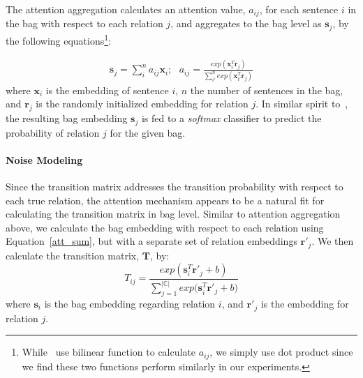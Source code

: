 The attention aggregation calculates an attention value, $a_{ij}$, for each sentence $i$ in the bag with respect to each relation $j$, and aggregates to  the bag level as  $\mathbf{s}_j$, by the following equations\footnote{While~\cite{lin2016neural} use bilinear function to calculate $a_{ij}$, we simply use dot product since we find these two functions perform similarly in our experiments.}:

\begin{equation}
\begin{aligned}
\mathbf{s}_j = \sum_i^{n}{a_{ij} \mathbf{x}_{i}}; \mbox{       }a_{ij} = \frac{exp(\mathbf{x}_i^T \mathbf{r}_j)}{\sum_{i'}^n{exp(\mathbf{x}_{i'}^T \mathbf{r}_j)}}
\end{aligned}
\label{att_sum}
\end{equation}
%
where $\mathbf{x}_{i}$ is the embedding of sentence $i$, $n$ the number of sentences in the bag, and $\mathbf{r}_j$ is the randomly initialized embedding for relation $j$.
In similar spirit to~\cite{lin2016neural},
the resulting bag embedding $\mathbf{s}_j$ is fed to a \emph{softmax} classifier %
to predict the probability of relation $j$ for the given bag.

\paragraph{Noise Modeling}
Since the transition matrix addresses the transition probability with respect to each true relation, the attention mechanism appears to be a natural fit for calculating the transition matrix in bag level.
Similar to attention aggregation above,
we calculate the bag embedding with respect to each relation using Equation~\ref{att_sum},  but with a separate set of relation embeddings $\mathbf{r'}_j$.
We then calculate the transition matrix, $\mathbf{T}$, by:
\begin{equation}
T_{ij} = \frac{exp({\mathbf{s}_i^T \mathbf{r'}_j  + b})}{\sum_{j=1}^{|\mathbb{C}|}{exp(\mathbf{s}_i^T \mathbf{r'}_j + b})}
\end{equation}
where $\mathbf{s}_i$ is the bag embedding regarding relation $i$, and $\mathbf{r'}_j$ is the embedding for relation $j$.


